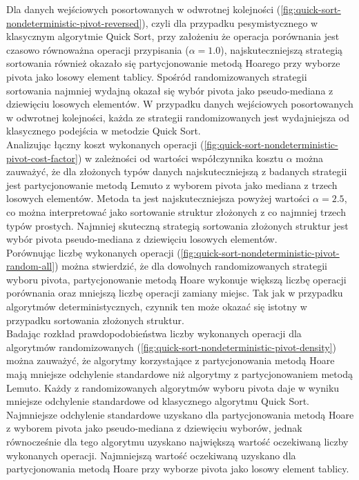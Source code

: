 Dla danych wejściowych posortowanych w odwrotnej kolejności (\ref{fig:quick-sort-nondeterministic-pivot-reversed}), czyli dla przypadku pesymistycznego w klasycznym algorytmie Quick Sort, przy założeniu że operacja porównania jest czasowo równoważna operacji przypisania ($\alpha=1.0$), najskuteczniejszą strategią sortowania również okazało się partycjonowanie metodą Hoarego przy wyborze pivota jako losowy element tablicy. Spośród randomizowanych strategii sortowania najmniej wydajną okazał się wybór pivota jako pseudo-mediana z dziewięciu losowych elementów. W przypadku danych wejściowych posortowanych w odwrotnej kolejności, każda ze strategii randomizowanych jest wydajniejsza od klasycznego podejścia w metodzie Quick Sort.\\

Analizując łączny koszt wykonanych operacji (\ref{fig:quick-sort-nondeterministic-pivot-cost-factor}) w zależności od wartości współczynnika kosztu $\alpha$ można zauważyć, że dla złożonych typów danych najskuteczniejszą z badanych strategii jest partycjonowanie metodą Lemuto z wyborem pivota jako mediana z trzech losowych elementów. Metoda ta jest najskuteczniejsza powyżej wartości $\alpha = 2.5$, co można interpretować jako sortowanie struktur złożonych z co najmniej trzech typów prostych. Najmniej skuteczną strategią sortowania złożonych struktur jest wybór pivota pseudo-mediana z dziewięciu losowych elementów.\\

Porównując liczbę wykonanych operacji (\ref{fig:quick-sort-nondeterministic-pivot-random-all}) można stwierdzić, że dla dowolnych randomizowanych strategii wyboru pivota, partycjonowanie metodą Hoare wykonuje większą liczbę operacji porównania oraz mniejszą liczbę operacji zamiany miejsc. Tak jak w przypadku algorytmów deterministycznych, czynnik ten może okazać się istotny w przypadku sortowania złożonych struktur.\\

Badając rozkład prawdopodobieństwa liczby wykonanych operacji dla algorytmów randomizowanych (\ref{fig:quick-sort-nondeterministic-pivot-density}) można zauważyć, że algorytmy korzystające z partycjonowania metodą Hoare mają mniejsze odchylenie standardowe niż algorytmy z partycjonowaniem metodą Lemuto. Każdy z randomizowanych algorytmów wyboru pivota daje w wyniku mniejsze odchylenie standardowe od klasycznego algorytmu Quick Sort. Najmniejsze odchylenie standardowe uzyskano dla partycjonowania metodą Hoare z wyborem pivota jako pseudo-mediana z dziewięciu wyborów, jednak równocześnie dla tego algorytmu uzyskano największą wartość oczekiwaną liczby wykonanych operacji. Najmniejszą wartość oczekiwaną uzyskano dla partycjonowania metodą Hoare przy wyborze pivota jako losowy element tablicy.

